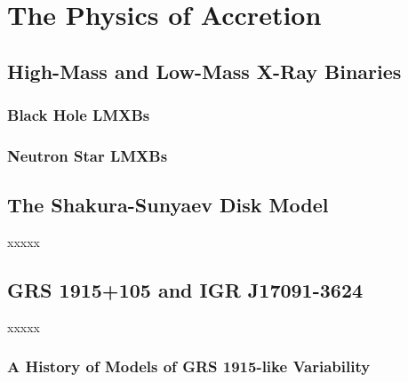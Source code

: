 \chapter{The Physics of Accretion}

\section{High-Mass and Low-Mass X-Ray Binaries}

\subsection{Black Hole LMXBs}

\subsection{Neutron Star LMXBs}

\section{The Shakura-Sunyaev Disk Model}

xxxxx

\section{GRS 1915+105 and IGR J17091-3624}

xxxxx

\subsection{A History of Models of GRS 1915-like Variability}


